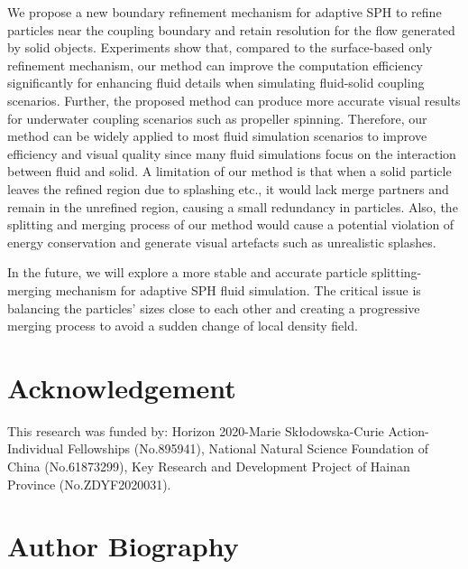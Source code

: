 \documentclass[VANCOUVER,STIX1COL]{WileyNJD-v2}
\begin{document}
We propose a new boundary refinement mechanism for adaptive SPH to refine particles near the coupling boundary and retain resolution for the flow generated by solid objects. 
%
Experiments show that, compared to the surface-based only refinement mechanism, our method can improve the computation efficiency significantly for enhancing fluid details when simulating fluid-solid coupling scenarios. 
%
Further, the proposed method can produce more accurate visual results for underwater coupling scenarios such as propeller spinning.
%
Therefore, our method can be widely applied to most fluid simulation scenarios to improve efficiency and visual quality since many fluid simulations focus on the interaction between fluid and solid. 
%
A limitation of our method is that when a solid particle leaves the refined region due to splashing etc., it would lack merge partners and remain in the unrefined region, causing a small redundancy in particles. Also, the splitting and merging process of our method would cause a potential violation of energy conservation and generate visual artefacts such as unrealistic splashes.

In the future, we will explore a more stable and accurate particle splitting-merging mechanism for adaptive SPH fluid simulation. The critical issue is balancing the particles' sizes close to each other and creating a progressive merging process to avoid a sudden change of local density field. 



\section*{Acknowledgement}
This research was funded by: Horizon 2020-Marie Skłodowska-Curie Action-Individual Fellowships (No.895941), National Natural Science Foundation of China (No.61873299), Key Research and Development Project of Hainan Province (No.ZDYF2020031).

\nocite{*}%


\section*{Author Biography}
\end{document}
